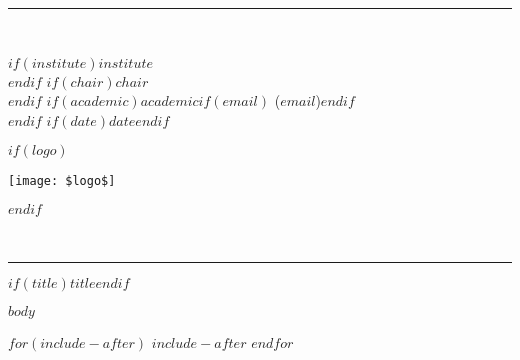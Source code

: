 \documentclass[a4paper]{article}
\newcommand{\HRule}{\noindent\rule{\linewidth}{0.3mm}}
\begin{document}
\def\cabecalho{
  \thispagestyle{empty}
  \HRule\\[-0.1cm]

  \noindent
  \begin{minipage}[c]{0.75\textwidth}
    \baselineskip 12pt
    $if(institute)$$institute$\\ $endif$
    $if(chair)$$chair$\\ $endif$
    $if(academic)$$academic$$if(email)$ ($email$)$endif$\\ $endif$
    $if(date)$$date$$endif$\\
  \end{minipage}
  \hfill
  \begin{minipage}[c]{0.25\textwidth}
    $if(logo)$
    \begin{flushright}
      \vspace*{-0.35cm}
      \texttt{[image: \$logo\$]}
    \end{flushright}
    $endif$
  \end{minipage}\\[-0.1cm]
  \HRule \hspace{0.5cm}
  \begin{center}
    $if(title)$\huge \bfseries $title$$endif$\\[0.5cm]
  \end{center}
}

\cabecalho{}

$body$

$for(include-after)$
  $include-after$
$endfor$
\end{document}
